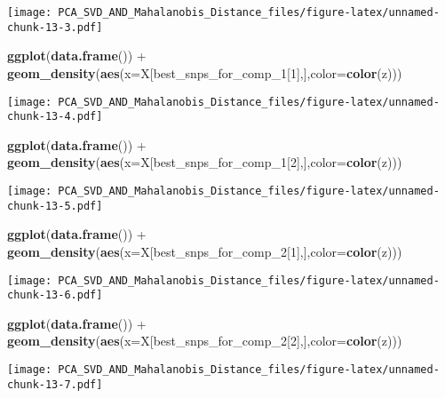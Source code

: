 \documentclass[]{article}
\newenvironment{Shaded}{\begin{snugshade}}{\end{snugshade}}
\newcommand{\KeywordTok}[1]{\textcolor[rgb]{0.13,0.29,0.53}{\textbf{{#1}}}}
\newcommand{\DataTypeTok}[1]{\textcolor[rgb]{0.13,0.29,0.53}{{#1}}}
\newcommand{\DecValTok}[1]{\textcolor[rgb]{0.00,0.00,0.81}{{#1}}}
\newcommand{\StringTok}[1]{\textcolor[rgb]{0.31,0.60,0.02}{{#1}}}
\newcommand{\NormalTok}[1]{{#1}}
\begin{document}
\texttt{[image: PCA\_SVD\_AND\_Mahalanobis\_Distance\_files/figure-latex/unnamed-chunk-13-3.pdf]}

\begin{Shaded}
\begin{Highlighting}[]
\KeywordTok{ggplot}\NormalTok{(}\KeywordTok{data.frame}\NormalTok{()) +}\StringTok{ }\KeywordTok{geom_density}\NormalTok{(}\KeywordTok{aes}\NormalTok{(}\DataTypeTok{x=}\NormalTok{X[best_snps_for_comp_1[}\DecValTok{1}\NormalTok{],],}\DataTypeTok{color=}\KeywordTok{color}\NormalTok{(z)))}
\end{Highlighting}
\end{Shaded}

\texttt{[image: PCA\_SVD\_AND\_Mahalanobis\_Distance\_files/figure-latex/unnamed-chunk-13-4.pdf]}

\begin{Shaded}
\begin{Highlighting}[]
\KeywordTok{ggplot}\NormalTok{(}\KeywordTok{data.frame}\NormalTok{()) +}\StringTok{ }\KeywordTok{geom_density}\NormalTok{(}\KeywordTok{aes}\NormalTok{(}\DataTypeTok{x=}\NormalTok{X[best_snps_for_comp_1[}\DecValTok{2}\NormalTok{],],}\DataTypeTok{color=}\KeywordTok{color}\NormalTok{(z)))}
\end{Highlighting}
\end{Shaded}

\texttt{[image: PCA\_SVD\_AND\_Mahalanobis\_Distance\_files/figure-latex/unnamed-chunk-13-5.pdf]}

\begin{Shaded}
\begin{Highlighting}[]
\KeywordTok{ggplot}\NormalTok{(}\KeywordTok{data.frame}\NormalTok{()) +}\StringTok{ }\KeywordTok{geom_density}\NormalTok{(}\KeywordTok{aes}\NormalTok{(}\DataTypeTok{x=}\NormalTok{X[best_snps_for_comp_2[}\DecValTok{1}\NormalTok{],],}\DataTypeTok{color=}\KeywordTok{color}\NormalTok{(z)))}
\end{Highlighting}
\end{Shaded}

\texttt{[image: PCA\_SVD\_AND\_Mahalanobis\_Distance\_files/figure-latex/unnamed-chunk-13-6.pdf]}

\begin{Shaded}
\begin{Highlighting}[]
\KeywordTok{ggplot}\NormalTok{(}\KeywordTok{data.frame}\NormalTok{()) +}\StringTok{ }\KeywordTok{geom_density}\NormalTok{(}\KeywordTok{aes}\NormalTok{(}\DataTypeTok{x=}\NormalTok{X[best_snps_for_comp_2[}\DecValTok{2}\NormalTok{],],}\DataTypeTok{color=}\KeywordTok{color}\NormalTok{(z)))}
\end{Highlighting}
\end{Shaded}

\texttt{[image: PCA\_SVD\_AND\_Mahalanobis\_Distance\_files/figure-latex/unnamed-chunk-13-7.pdf]}
\end{document}
